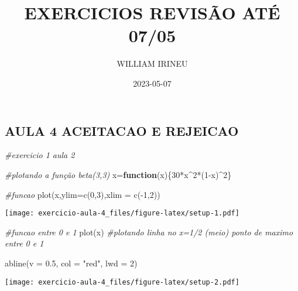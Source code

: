 \documentclass[
]{article}
\title{EXERCICIOS REVISÃO ATÉ 07/05}
\author{WILLIAM IRINEU}
\date{2023-05-07}
\newenvironment{Shaded}{\begin{snugshade}}{\end{snugshade}}
\newcommand{\AttributeTok}[1]{\textcolor[rgb]{0.77,0.63,0.00}{#1}}
\newcommand{\CommentTok}[1]{\textcolor[rgb]{0.56,0.35,0.01}{\textit{#1}}}
\newcommand{\ControlFlowTok}[1]{\textcolor[rgb]{0.13,0.29,0.53}{\textbf{#1}}}
\newcommand{\DecValTok}[1]{\textcolor[rgb]{0.00,0.00,0.81}{#1}}
\newcommand{\FloatTok}[1]{\textcolor[rgb]{0.00,0.00,0.81}{#1}}
\newcommand{\FunctionTok}[1]{\textcolor[rgb]{0.00,0.00,0.00}{#1}}
\newcommand{\NormalTok}[1]{#1}
\newcommand{\OtherTok}[1]{\textcolor[rgb]{0.56,0.35,0.01}{#1}}
\newcommand{\SpecialCharTok}[1]{\textcolor[rgb]{0.00,0.00,0.00}{#1}}
\newcommand{\StringTok}[1]{\textcolor[rgb]{0.31,0.60,0.02}{#1}}
\begin{document}
\maketitle

\hypertarget{aula-4-aceitacao-e-rejeicao}{%
\subsection{AULA 4 ACEITACAO E
REJEICAO}\label{aula-4-aceitacao-e-rejeicao}}

\begin{Shaded}
\begin{Highlighting}[]
\CommentTok{\#exercicio 1 aula 2}

\CommentTok{\#plotando a função beta(3,3)}
\NormalTok{x}\OtherTok{=}\ControlFlowTok{function}\NormalTok{(x)\{}\DecValTok{30}\SpecialCharTok{*}\NormalTok{x}\SpecialCharTok{\^{}}\DecValTok{2}\SpecialCharTok{*}\NormalTok{(}\DecValTok{1}\SpecialCharTok{{-}}\NormalTok{x)}\SpecialCharTok{\^{}}\DecValTok{2}\NormalTok{\}}

\CommentTok{\#funcao}
\FunctionTok{plot}\NormalTok{(x,}\AttributeTok{ylim=}\FunctionTok{c}\NormalTok{(}\DecValTok{0}\NormalTok{,}\DecValTok{3}\NormalTok{),}\AttributeTok{xlim =} \FunctionTok{c}\NormalTok{(}\SpecialCharTok{{-}}\DecValTok{1}\NormalTok{,}\DecValTok{2}\NormalTok{))}
\end{Highlighting}
\end{Shaded}

\texttt{[image: exercicio-aula-4\_files/figure-latex/setup-1.pdf]}

\begin{Shaded}
\begin{Highlighting}[]
\CommentTok{\#funcao entre 0 e 1}
\FunctionTok{plot}\NormalTok{(x)}
\CommentTok{\#plotando linha no x=1/2 (meio) ponto de maximo entre 0 e 1}

\FunctionTok{abline}\NormalTok{(}\AttributeTok{v =} \FloatTok{0.5}\NormalTok{, }\AttributeTok{col =} \StringTok{"red"}\NormalTok{, }\AttributeTok{lwd =} \DecValTok{2}\NormalTok{)}
\end{Highlighting}
\end{Shaded}

\texttt{[image: exercicio-aula-4\_files/figure-latex/setup-2.pdf]}
\end{document}
